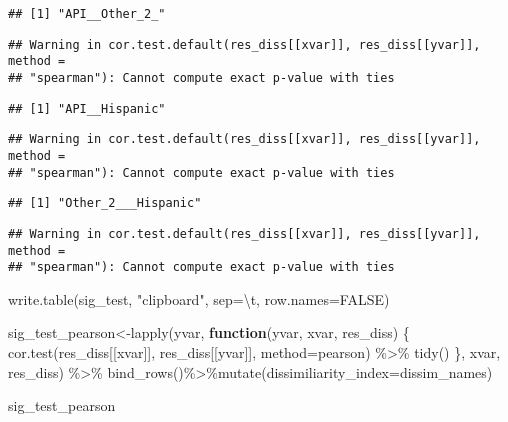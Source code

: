 \documentclass[
]{article}
\newenvironment{Shaded}{\begin{snugshade}}{\end{snugshade}}
\newcommand{\AttributeTok}[1]{\textcolor[rgb]{0.77,0.63,0.00}{#1}}
\newcommand{\ConstantTok}[1]{\textcolor[rgb]{0.00,0.00,0.00}{#1}}
\newcommand{\ControlFlowTok}[1]{\textcolor[rgb]{0.13,0.29,0.53}{\textbf{#1}}}
\newcommand{\FunctionTok}[1]{\textcolor[rgb]{0.00,0.00,0.00}{#1}}
\newcommand{\NormalTok}[1]{#1}
\newcommand{\OtherTok}[1]{\textcolor[rgb]{0.56,0.35,0.01}{#1}}
\newcommand{\SpecialCharTok}[1]{\textcolor[rgb]{0.00,0.00,0.00}{#1}}
\newcommand{\StringTok}[1]{\textcolor[rgb]{0.31,0.60,0.02}{#1}}
\begin{document}
\begin{verbatim}
## [1] "API__Other_2_"
\end{verbatim}

\begin{verbatim}
## Warning in cor.test.default(res_diss[[xvar]], res_diss[[yvar]], method =
## "spearman"): Cannot compute exact p-value with ties
\end{verbatim}

\begin{verbatim}
## [1] "API__Hispanic"
\end{verbatim}

\begin{verbatim}
## Warning in cor.test.default(res_diss[[xvar]], res_diss[[yvar]], method =
## "spearman"): Cannot compute exact p-value with ties
\end{verbatim}

\begin{verbatim}
## [1] "Other_2___Hispanic"
\end{verbatim}

\begin{verbatim}
## Warning in cor.test.default(res_diss[[xvar]], res_diss[[yvar]], method =
## "spearman"): Cannot compute exact p-value with ties
\end{verbatim}

\begin{Shaded}
\begin{Highlighting}[]
\FunctionTok{write.table}\NormalTok{(sig\_test, }\StringTok{"clipboard"}\NormalTok{, }\AttributeTok{sep=}\StringTok{\textquotesingle{}}\SpecialCharTok{\textbackslash{}t}\StringTok{\textquotesingle{}}\NormalTok{, }\AttributeTok{row.names=}\ConstantTok{FALSE}\NormalTok{)}

\NormalTok{sig\_test\_pearson}\OtherTok{\textless{}{-}}\FunctionTok{lapply}\NormalTok{(yvar,}
       \ControlFlowTok{function}\NormalTok{(yvar, xvar, res\_diss)}
\NormalTok{       \{}
         \FunctionTok{cor.test}\NormalTok{(res\_diss[[xvar]], res\_diss[[yvar]], }\AttributeTok{method=}\StringTok{\textquotesingle{}pearson\textquotesingle{}}\NormalTok{) }\SpecialCharTok{\%\textgreater{}\%}
           \FunctionTok{tidy}\NormalTok{()}
\NormalTok{       \},}
\NormalTok{       xvar,}
\NormalTok{       res\_diss) }\SpecialCharTok{\%\textgreater{}\%}
  \FunctionTok{bind\_rows}\NormalTok{()}\SpecialCharTok{\%\textgreater{}\%}\FunctionTok{mutate}\NormalTok{(}\StringTok{\textquotesingle{}dissimiliarity\_index\textquotesingle{}}\OtherTok{=}\NormalTok{dissim\_names)}

\NormalTok{sig\_test\_pearson}
\end{Highlighting}
\end{Shaded}
\end{document}
